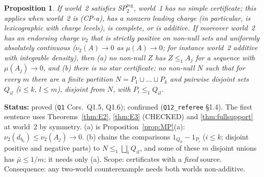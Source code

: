 \documentclass[11pt]{article}
\newtheorem{proposition}[theorem]{Proposition}
\theoremstyle{definition}
\theoremstyle{remark}
\newcommand{\src}[1]{\texttt{#1}}
\newcommand{\status}[1]{\par\smallskip\noindent\textbf{Status:} #1\par\smallskip}
\begin{document}
\begin{proposition}\label{prop:Q15}
If world~2 satisfies SP$^{\mathrm{reg}}_2$, world~1 has no simple certificate; this applies when world~2 is (CP-a), has a nonzero leading charge (in particular, is lexicographic with charge levels), is complete, or is additive. If moreover world~2 has an endorsing charge $\nu_2$ that is strictly positive on non-null sets and uniformly absolutely continuous ($\nu_2(A)\to0$ as $\mu(A)\to0$; for instance world~2 additive with integrable density), then (a) no non-null $Z$ has $Z\le_1A_j$ for a sequence with $\mu(A_j)\to0$, and (b) there is no \emph{star certificate}: no non-null $N$ such that for every $m$ there are a finite partition $N=P_1\sqcup\dots\sqcup P_k$ and pairwise disjoint sets $Q_{il}$ ($i\le k$, $l\le m$), disjoint from $N$, with $P_i\le_1Q_{il}$.
\end{proposition}
\status{proved (\src{Q1} Cors.~Q1.5, Q1.6); confirmed (\src{Q12\_referee} \S1.4). The first sentence uses Theorems~\ref{thm:E2}, \ref{thm:E3} (CHECKED) and \ref{thm:fullsupport} at world~2 by symmetry. (a) is Proposition~\ref{prop:MP}(a): $\nu_2(d_{b_0})\le\nu_2(A_j)\to0$. (b) chains the comparisons $1_{Q_{il}}-1_{P_i}$ ($i\le k$; disjoint positive and negative parts) to $N\le_1\bigsqcup_iQ_{il}$, and some of these $m$ disjoint unions has $\bar\mu\le1/m$; it needs only (a). Scope: certificates with a \emph{fixed} source. Consequence: any two-world counterexample needs both worlds non-additive.}
\end{document}
